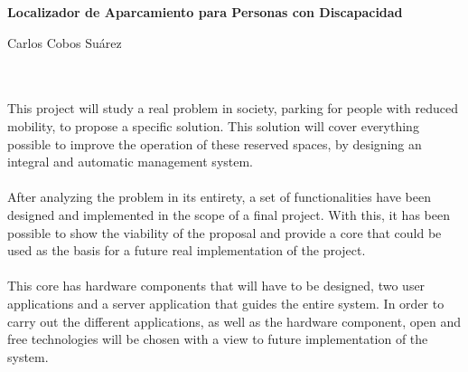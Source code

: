 \begin{center}
	{\large\bfseries Localizador de Aparcamiento para Personas con Discapacidad}\\
\end{center}
\begin{center}
	Carlos Cobos Suárez\\
\end{center}

\vspace{0.7cm}
\\

\vspace{0.7cm}
\\

This project will study a real problem in society, parking for people with reduced mobility, to propose a specific solution. This solution will cover everything possible to improve the operation of these reserved spaces, by designing an integral and automatic management system.
\\\\
After analyzing the problem in its entirety, a set of functionalities have been designed and implemented in the scope of a final project. With this, it has been possible to show the viability of the proposal and provide a core that could be used as the basis for a future real implementation of the project.
\\\\
This core has hardware components that will have to be designed, two user applications and a server application that guides the entire system. In order to carry out the different applications, as well as the hardware component, open and free technologies will be chosen with a view to future implementation of the system.
